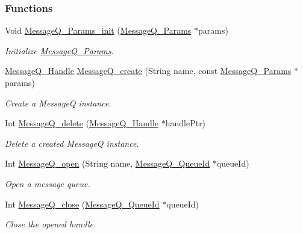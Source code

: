 \subsubsection*{Functions}
\begin{DoxyCompactItemize}
\item 
Void \hyperlink{_message_q_8h_a896b64c7afc22be66f1a6c3aa157537f}{MessageQ\_\-Params\_\-init} (\hyperlink{struct_message_q___params}{MessageQ\_\-Params} $\ast$params)
\begin{DoxyCompactList}\small\item\em Initialize \hyperlink{struct_message_q___params}{MessageQ\_\-Params}. \item\end{DoxyCompactList}\item 
\hyperlink{_message_q_8h_a1d584ce08733ca864d81e1e64a41cf7a}{MessageQ\_\-Handle} \hyperlink{_message_q_8h_a1f2be1c6bf60aa6e220cf5805052f727}{MessageQ\_\-create} (String name, const \hyperlink{struct_message_q___params}{MessageQ\_\-Params} $\ast$params)
\begin{DoxyCompactList}\small\item\em Create a MessageQ instance. \item\end{DoxyCompactList}\item 
Int \hyperlink{_message_q_8h_a10986c1a6b64d3ca07c38d1521ea16cd}{MessageQ\_\-delete} (\hyperlink{_message_q_8h_a1d584ce08733ca864d81e1e64a41cf7a}{MessageQ\_\-Handle} $\ast$handlePtr)
\begin{DoxyCompactList}\small\item\em Delete a created MessageQ instance. \item\end{DoxyCompactList}\item 
Int \hyperlink{_message_q_8h_af9e6bd0c1dbb236eb4a618211bf15325}{MessageQ\_\-open} (String name, \hyperlink{_message_q_8h_a34dd32b58cf0476c2d90e3f702843297}{MessageQ\_\-QueueId} $\ast$queueId)
\begin{DoxyCompactList}\small\item\em Open a message queue. \item\end{DoxyCompactList}\item 
Int \hyperlink{_message_q_8h_ab2cdb25f8e9fec3fe3f17a43c0b85bed}{MessageQ\_\-close} (\hyperlink{_message_q_8h_a34dd32b58cf0476c2d90e3f702843297}{MessageQ\_\-QueueId} $\ast$queueId)
\begin{DoxyCompactList}\small\item\em Close the opened handle. \item\end{DoxyCompactList}\item 

\end{DoxyCompactItemize}
